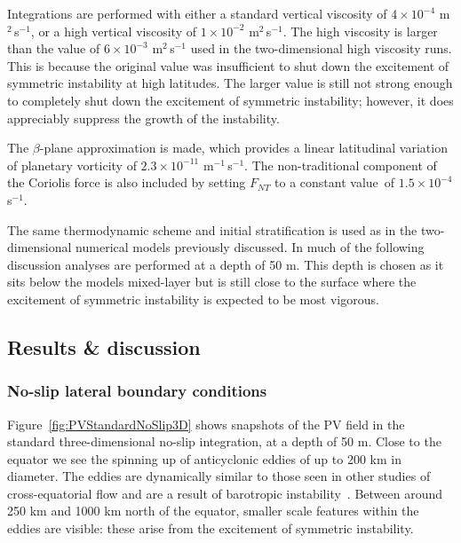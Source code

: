    Integrations are performed with either a standard vertical viscosity of $4\times 10^{-4}$ m$^2$\,s$^{-1}$, or a high vertical viscosity of $1\times 10^{-2}$ m$^2$\,s$^{-1}$. The high viscosity is larger than the value of $6\times 10^{-3}$ m$^2$\,s$^{-1}$ used in the two-dimensional high viscosity runs. This is because the original value was insufficient to shut down the excitement of symmetric instability at high latitudes. The larger value is still not strong enough to completely shut down the excitement of symmetric instability; however, it does appreciably suppress the growth of the instability.

    The $\beta$-plane approximation is made, which provides a linear latitudinal variation of planetary vorticity of $2.3\times 10^{-11}$ m$^{-1}$\,s$^{-1}$. The non-traditional component of the Coriolis force is also included by setting $F_{NT}$ to a constant value\footnotemark~of $1.5\times 10^{-4}$ s$^{-1}$.

    
    The same thermodynamic scheme and initial stratification is used as in the two-dimensional numerical models previously discussed. In much of the following discussion analyses are performed at a depth of 50 m. This depth is chosen as it sits below the models mixed-layer but is still close to the surface where the excitement of symmetric instability is expected to be most vigorous.

    \subsection{Results \& discussion}
    \label{subsec:3DResults}
    \subsubsection{No-slip lateral boundary conditions}
    Figure~\ref{fig:PVStandardNoSlip3D} shows snapshots of the PV field in the standard three-dimensional no-slip integration, at a depth of 50 m. Close to the equator we see the spinning up of anticyclonic eddies of up to 200 km in diameter. The eddies are dynamically similar to those seen in other studies of cross-equatorial flow and are a result of barotropic instability~\citep[e.g.][]{Edwards1998I, Edwards1998II, Jochum2003, Goes2009}. Between around 250 km and 1000 km north of the equator, smaller scale features within the eddies are visible: these arise from the excitement of symmetric instability.


